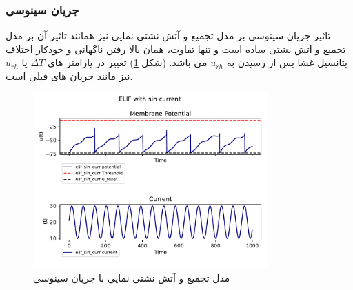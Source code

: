 \documentclass{article}
\begin{document}
            \subsubsection{جریان سینوسی}
                تاثیر جریان سینوسی بر مدل تجمیع و آتش نشتی نمایی نیز همانند تاثیر آن بر مدل تجمیع و آتش نشتی ساده است و تنها تفاوت، همان بالا رفتن ناگهانی و خودکار اختلاف پتانسیل غشا پس از رسیدن به 
                $u_{rh}$ 
                می باشد.
                (شکل \ref{fig:elif-sin-curr})
                تغییر در پارامتر های 
                $\Delta T$ یا
                $u_{rh}$ 
                نیز مانند جریان های قبلی است.
                \begin{figure}[H]
                    \centering
                    \includegraphics[width=0.8\textwidth]{plots/ELIF with sin current.pdf} 
                    \caption{مدل تجمیع و آتش نشتی نمایی با جریان سینوسی}
                    \label{fig:elif-sin-curr}
                \end{figure}
\end{document}
